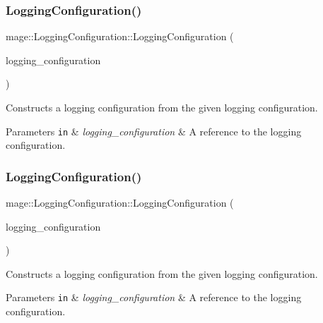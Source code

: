 \subsubsection{\texorpdfstring{Logging\+Configuration()}{LoggingConfiguration()}\hspace{0.1cm}{\footnotesize\ttfamily [2/3]}}
{\footnotesize\ttfamily mage\+::\+Logging\+Configuration\+::\+Logging\+Configuration (\begin{DoxyParamCaption}\item[{const \hyperlink{structmage_1_1_logging_configuration}{Logging\+Configuration} \&}]{logging\+\_\+configuration }\end{DoxyParamCaption})\hspace{0.3cm}{\ttfamily [default]}}

Constructs a logging configuration from the given logging configuration.


\begin{DoxyParams}[1]{Parameters}
\mbox{\tt in}  & {\em logging\+\_\+configuration} & A reference to the logging configuration. \\
\hline
\end{DoxyParams}
\hypertarget{structmage_1_1_logging_configuration_ad5d3dd901720450fcf57d4b1b32fce15}{}\label{structmage_1_1_logging_configuration_ad5d3dd901720450fcf57d4b1b32fce15} 
\subsubsection{\texorpdfstring{Logging\+Configuration()}{LoggingConfiguration()}\hspace{0.1cm}{\footnotesize\ttfamily [3/3]}}
{\footnotesize\ttfamily mage\+::\+Logging\+Configuration\+::\+Logging\+Configuration (\begin{DoxyParamCaption}\item[{\hyperlink{structmage_1_1_logging_configuration}{Logging\+Configuration} \&\&}]{logging\+\_\+configuration }\end{DoxyParamCaption})\hspace{0.3cm}{\ttfamily [default]}}

Constructs a logging configuration from the given logging configuration.


\begin{DoxyParams}[1]{Parameters}
\mbox{\tt in}  & {\em logging\+\_\+configuration} & A reference to the logging configuration. \\
\hline
\end{DoxyParams}
\hypertarget{structmage_1_1_logging_configuration_a842cd1d5cf22c9fb6e2c76e684cd08ee}{}\label{structmage_1_1_logging_configuration_a842cd1d5cf22c9fb6e2c76e684cd08ee} 
